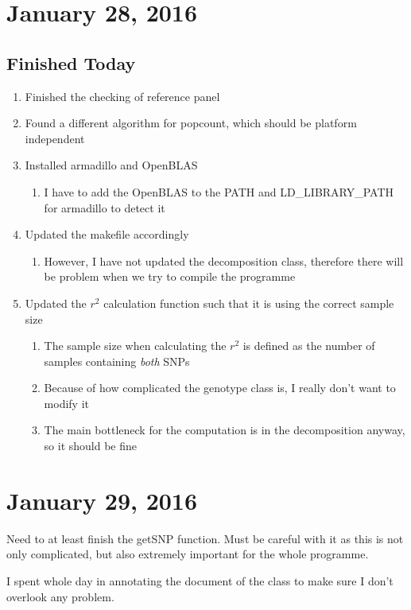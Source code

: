 \documentclass[12pt]{article}
\begin{document}
	\section{January 28, 2016}
	\subsection{Finished Today}
	\begin{enumerate}
		\item Finished the checking of reference panel
		\item Found a different algorithm for popcount, which should be platform independent
		\item Installed armadillo and OpenBLAS
		\begin{enumerate}
			\item I have to add the OpenBLAS to the PATH and LD\_LIBRARY\_PATH for armadillo to detect it
		\end{enumerate}
		\item Updated the makefile accordingly
		\begin{enumerate}
			\item However, I have not updated the decomposition class, therefore there will be problem when we try to compile the programme
		\end{enumerate}
		\item Updated the $r^2$ calculation function such that it is using the correct sample size
		\begin{enumerate}
			\item The sample size when calculating the $r^2$ is defined as the number of samples containing \emph{both} SNPs
			\item Because of how complicated the genotype class is, I really don't want to modify it
			\item The main bottleneck for the computation is in the decomposition anyway, so it should be fine
		\end{enumerate}
		
	\end{enumerate}
	
	\section{January 29, 2016}
	Need to at least finish the getSNP function.
	Must be careful with it as this is not only complicated, but also extremely important for the whole programme.
	
	I spent whole day in annotating the document of the class to make sure I don't overlook any problem.
	
\end{document}
